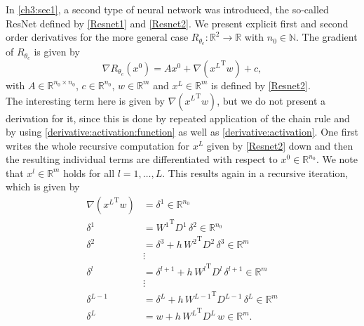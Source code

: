 In \cref{ch3:sec1}, a second type of neural network was introduced, the so-called ResNet defined by \cref{Resnet1} and \cref{Resnet2}. We present explicit first and second order derivatives for the more general case $R_{\theta_e} \colon \mathbb{R}^2 \to \mathbb{R}$ with $n_0 \in \mathbb{N}$. The gradient of $R_{\theta_e}$ is given by 
\begin{equation*}
    \nabla R_{\theta_e}(x^0) = A x^0 + \nabla \left( {x^{L}}^{\mathrm{T}} w \right) + c,
\end{equation*}
with $A \in \mathbb{R}^{n_0 \times n_0}$, $c \in \mathbb{R}^{n_0}$, $w \in \mathbb{R}^{m}$ and $x^{L} \in \mathbb{R}^{m}$ is defined by \cref{Resnet2}. \\
The interesting term here is given by $\nabla \left( {x^{L}}^{\mathrm{T}} w \right)$, but we do not present a derivation for it, since this is done by repeated application of the chain rule and by using \cref{derivative:activation:function} as well as \cref{derivative:activation}. One first writes the whole recursive computation for $x^{L}$ given by \cref{Resnet2} down and then the resulting individual terms are differentiated with respect to $x^0 \in \mathbb{R}^{n_0}$. We note that $x^l \in \mathbb{R}^{m}$ holds for all $l = 1, \ldots, L$. This results again in a recursive iteration, which is given by 
\begin{equation}
    \label{ResNetgradient}
    \begin{aligned}
        \nabla \left( {x^{L}}^{\mathrm{T}} w \right) & = \delta^{1} \in \mathbb{R}^{n_0}  \\
        \delta^{1} & = {W^{1}}^{\mathrm{T}} D^{1} \, \delta^{2} \in \mathbb{R}^{n_0} \\
        \delta^{2} & = \delta^{3} + h \, {W^{2}}^{\mathrm{T}} D^{2} \, \delta^{3} \in \mathbb{R}^{m} \\
        &\vdots\\
        \delta^{l} & = \delta^{l+1} + h \, {W^{l}}^{\mathrm{T}} D^{l} \, \delta^{l+1} \in \mathbb{R}^{m} \\
        &\vdots\\
        \delta^{L-1} & = \delta^{L} + h \, {W^{L-1}}^{\mathrm{T}} D^{L-1} \, \delta^{L} \in \mathbb{R}^{m} \\
        \delta^{L} & = w + h \, {W^{L}}^{\mathrm{T}} D^{L} \, w \in \mathbb{R}^{m}.
    \end{aligned}   
\end{equation}

